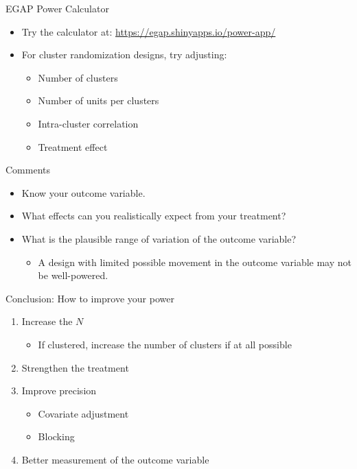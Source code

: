 \documentclass[
  ignorenonframetext,
]{beamer}
\providecommand{\tightlist}{%
  \setlength{\itemsep}{0pt}\setlength{\parskip}{0pt}}
\begin{document}
\begin{frame}{EGAP Power Calculator}
\protect\hypertarget{egap-power-calculator}{}
\begin{itemize}
\item
  Try the calculator at: \url{https://egap.shinyapps.io/power-app/}
\item
  For cluster randomization designs, try adjusting:

  \begin{itemize}
  \tightlist
  \item
    Number of clusters
  \item
    Number of units per clusters
  \item
    Intra-cluster correlation
  \item
    Treatment effect
  \end{itemize}
\end{itemize}
\end{frame}

\begin{frame}{Comments}
\protect\hypertarget{comments}{}
\begin{itemize}
\item
  Know your outcome variable.
\item
  What effects can you realistically expect from your treatment?
\item
  What is the plausible range of variation of the outcome variable?

  \begin{itemize}
  \tightlist
  \item
    A design with limited possible movement in the outcome variable may
    not be well-powered.
  \end{itemize}
\end{itemize}
\end{frame}

\begin{frame}{Conclusion: How to improve your power}
\protect\hypertarget{conclusion-how-to-improve-your-power}{}
\begin{enumerate}
\item
  Increase the \(N\)

  \begin{itemize}
  \tightlist
  \item
    If clustered, increase the number of clusters if at all possible
  \end{itemize}
\item
  Strengthen the treatment
\item
  Improve precision

  \begin{itemize}
  \item
    Covariate adjustment
  \item
    Blocking
  \end{itemize}
\item
  Better measurement of the outcome variable
\end{enumerate}
\end{frame}
\end{document}
